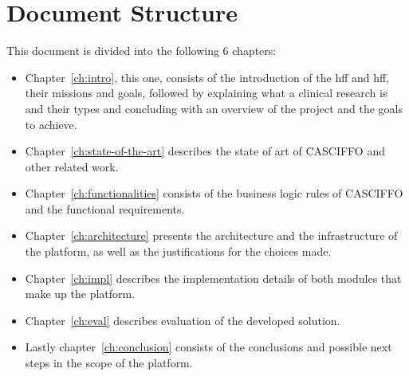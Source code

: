 \section{Document Structure}
This document is divided into the following 6 chapters: 

\begin{itemize}

    \item Chapter~\ref{ch:intro}, this one, consists of the introduction of the \acrshort{hff} and \acrshort{hff}, their missions and goals, followed by explaining what a clinical research is and their types and concluding with an overview of the project and the goals to achieve. 

    \item Chapter~\ref{ch:state-of-the-art} describes the state of art of CASCIFFO and other related work.

    \item Chapter~\ref{ch:functionalities} consists of the business logic rules of CASCIFFO and the functional requirements. 

    \item Chapter~\ref{ch:architecture} presents the architecture and the infrastructure of the platform, as well as the justifications for the choices made. 

    \item Chapter~\ref{ch:impl} describes the implementation details of both modules that make up the platform. 

    \item Chapter~\ref{ch:eval} describes evaluation of the developed solution.

    \item Lastly chapter~\ref{ch:conclusion} consists of the conclusions and possible next steps in the scope of the platform.

\end{itemize}
